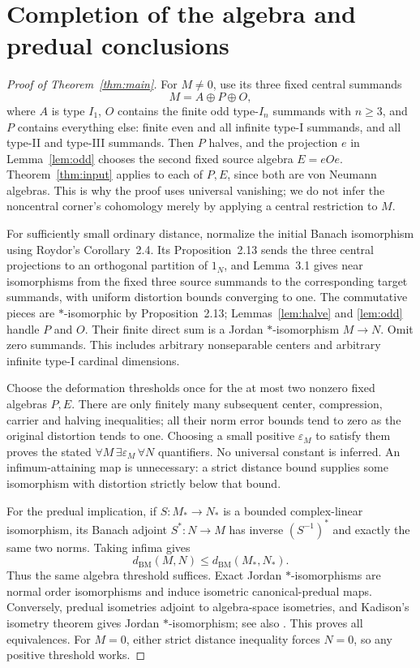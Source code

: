 \documentclass[11pt]{article}
\newcommand{\BM}{d_{\mathrm{BM}}}
\begin{document}
\section{Completion of the algebra and predual conclusions}
\begin{proof}[Proof of Theorem~\ref{thm:main}]
For $M\ne0$, use its three fixed central summands
\[
 M=A\oplus P\oplus O,
\]
where $A$ is type $I_1$, $O$ contains the finite odd type-$I_n$
summands with $n\ge3$, and $P$ contains everything else: finite even
and all infinite type-I summands, and all type-II and type-III summands.
Then $P$ halves, and the projection $e$ in Lemma~\ref{lem:odd}
chooses the second fixed source algebra $E=eOe$.
Theorem~\ref{thm:input} applies to each of $P,E$, since both are von
Neumann algebras. This is why the proof uses universal vanishing;
we do not infer the noncentral corner's cohomology merely by applying
a central restriction to $M$.

For sufficiently small ordinary distance, normalize the initial Banach
isomorphism using Roydor's Corollary~2.4. Its Proposition~2.13 sends the
three central projections to an orthogonal partition of $1_N$, and
Lemma~3.1 gives near isomorphisms from the fixed three source summands
to the corresponding target summands, with uniform distortion bounds
converging to one. The commutative pieces are $*$-isomorphic by
Proposition~2.13; Lemmas~\ref{lem:halve} and \ref{lem:odd} handle
$P$ and $O$. Their finite direct sum is a Jordan $*$-isomorphism
$M\to N$. Omit zero summands. This includes arbitrary nonseparable
centers and arbitrary infinite type-I cardinal dimensions.

Choose the deformation thresholds once for the at most two nonzero
fixed algebras $P,E$. There are only finitely many subsequent center,
compression, carrier and halving inequalities; all their norm error
bounds tend to zero as the original distortion tends to one. Choosing
a small positive $\varepsilon_M$ to satisfy them proves the stated
$\forall M\,\exists\varepsilon_M\,\forall N$ quantifiers. No universal
constant is inferred. An infimum-attaining map is unnecessary: a
strict distance bound supplies some isomorphism with distortion
strictly below that bound.

For the predual implication, if $S:M_*\to N_*$ is a bounded
complex-linear isomorphism, its Banach adjoint $S^*:N\to M$ has inverse
$(S^{-1})^*$ and exactly the same two norms. Taking infima gives
\[
 \BM(M,N)\le\BM(M_*,N_*).
\]
Thus the same algebra threshold suffices. Exact Jordan
$*$-isomorphisms are normal order isomorphisms and induce isometric
canonical-predual maps. Conversely, predual isometries adjoint to
algebra-space isometries, and Kadison's isometry theorem gives Jordan
$*$-isomorphism; see also \cite[Theorem 1.1]{Sherman}.
This proves all equivalences. For $M=0$, either strict distance
inequality forces $N=0$, so any positive threshold works.
\end{proof}
\end{document}

